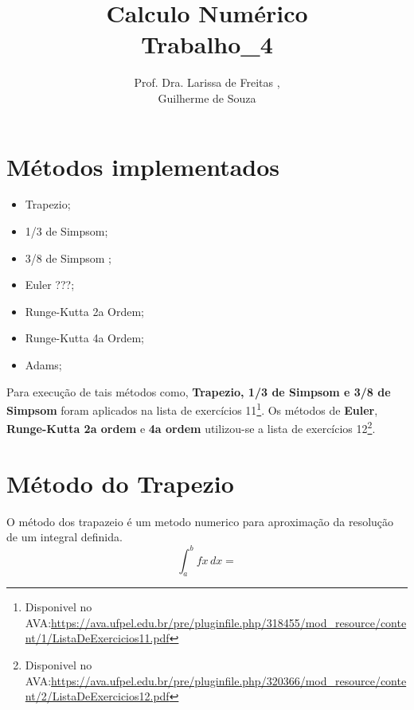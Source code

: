\documentclass[12pt]{article}
\title{Calculo Numérico\\Trabalho\_4}
\author{Prof. Dra. Larissa de Freitas \inst{1},\\Guilherme de Souza\inst{1}}
\begin{document}
 

\maketitle
\br

\section{Métodos implementados}
\begin{itemize}
  \item Trapezio;
  \item 1/3 de Simpsom;
  \item 3/8 de Simpsom ;
  \item Euler ???;
  \item Runge-Kutta 2a Ordem;
  \item Runge-Kutta 4a Ordem;
  \item Adams;
\end{itemize}

Para execução de tais métodos como, \textbf{Trapezio, 1/3 de Simpsom e 3/8 de Simpsom} foram aplicados na lista de exercícios 11\footnote{Disponivel no AVA:\url{https://ava.ufpel.edu.br/pre/pluginfile.php/318455/mod_resource/content/1/ListaDeExercicios11.pdf}}. Os métodos de \textbf{Euler}, \textbf{Runge-Kutta 2a ordem} e \textbf{4a ordem} utilizou-se a lista de exercícios 12\footnote{Disponivel no AVA:\url{https://ava.ufpel.edu.br/pre/pluginfile.php/320366/mod_resource/content/2/ListaDeExercicios12.pdf}}.


\section{Método do Trapezio}
 O método dos trapazeio é um metodo numerico para aproximação da resolução de um integral definida.
 \[\int_{a}^{b} \! fx \, dx = \]
\end{document}
